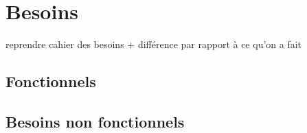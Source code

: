 \chapter{Besoins}
 reprendre  cahier des besoins + différence par rapport à ce qu'on a fait
 
 
\section{Fonctionnels}


\section{Besoins non fonctionnels}
